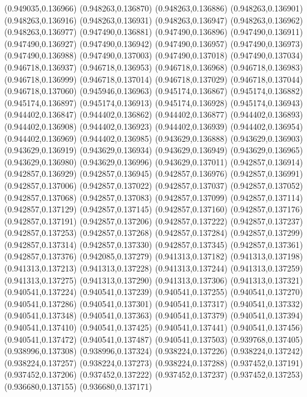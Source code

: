 (0.949035,0.136966)
(0.948263,0.136870)
(0.948263,0.136886)
(0.948263,0.136901)
(0.948263,0.136916)
(0.948263,0.136931)
(0.948263,0.136947)
(0.948263,0.136962)
(0.948263,0.136977)
(0.947490,0.136881)
(0.947490,0.136896)
(0.947490,0.136911)
(0.947490,0.136927)
(0.947490,0.136942)
(0.947490,0.136957)
(0.947490,0.136973)
(0.947490,0.136988)
(0.947490,0.137003)
(0.947490,0.137018)
(0.947490,0.137034)
(0.946718,0.136937)
(0.946718,0.136953)
(0.946718,0.136968)
(0.946718,0.136983)
(0.946718,0.136999)
(0.946718,0.137014)
(0.946718,0.137029)
(0.946718,0.137044)
(0.946718,0.137060)
(0.945946,0.136963)
(0.945174,0.136867)
(0.945174,0.136882)
(0.945174,0.136897)
(0.945174,0.136913)
(0.945174,0.136928)
(0.945174,0.136943)
(0.944402,0.136847)
(0.944402,0.136862)
(0.944402,0.136877)
(0.944402,0.136893)
(0.944402,0.136908)
(0.944402,0.136923)
(0.944402,0.136939)
(0.944402,0.136954)
(0.944402,0.136969)
(0.944402,0.136985)
(0.943629,0.136888)
(0.943629,0.136903)
(0.943629,0.136919)
(0.943629,0.136934)
(0.943629,0.136949)
(0.943629,0.136965)
(0.943629,0.136980)
(0.943629,0.136996)
(0.943629,0.137011)
(0.942857,0.136914)
(0.942857,0.136929)
(0.942857,0.136945)
(0.942857,0.136976)
(0.942857,0.136991)
(0.942857,0.137006)
(0.942857,0.137022)
(0.942857,0.137037)
(0.942857,0.137052)
(0.942857,0.137068)
(0.942857,0.137083)
(0.942857,0.137099)
(0.942857,0.137114)
(0.942857,0.137129)
(0.942857,0.137145)
(0.942857,0.137160)
(0.942857,0.137176)
(0.942857,0.137191)
(0.942857,0.137206)
(0.942857,0.137222)
(0.942857,0.137237)
(0.942857,0.137253)
(0.942857,0.137268)
(0.942857,0.137284)
(0.942857,0.137299)
(0.942857,0.137314)
(0.942857,0.137330)
(0.942857,0.137345)
(0.942857,0.137361)
(0.942857,0.137376)
(0.942085,0.137279)
(0.941313,0.137182)
(0.941313,0.137198)
(0.941313,0.137213)
(0.941313,0.137228)
(0.941313,0.137244)
(0.941313,0.137259)
(0.941313,0.137275)
(0.941313,0.137290)
(0.941313,0.137306)
(0.941313,0.137321)
(0.940541,0.137224)
(0.940541,0.137239)
(0.940541,0.137255)
(0.940541,0.137270)
(0.940541,0.137286)
(0.940541,0.137301)
(0.940541,0.137317)
(0.940541,0.137332)
(0.940541,0.137348)
(0.940541,0.137363)
(0.940541,0.137379)
(0.940541,0.137394)
(0.940541,0.137410)
(0.940541,0.137425)
(0.940541,0.137441)
(0.940541,0.137456)
(0.940541,0.137472)
(0.940541,0.137487)
(0.940541,0.137503)
(0.939768,0.137405)
(0.938996,0.137308)
(0.938996,0.137324)
(0.938224,0.137226)
(0.938224,0.137242)
(0.938224,0.137257)
(0.938224,0.137273)
(0.938224,0.137288)
(0.937452,0.137191)
(0.937452,0.137206)
(0.937452,0.137222)
(0.937452,0.137237)
(0.937452,0.137253)
(0.936680,0.137155)
(0.936680,0.137171)

